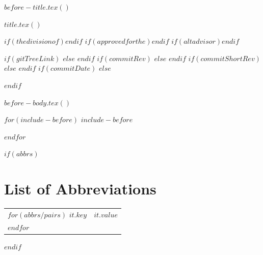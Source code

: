 $before-title.tex()$

$title.tex()$

$if(thedivisionof)$$endif$
$if(approvedforthe)$$endif$
$if(altadvisor)$$endif$

$if(gitTreeLink)$
\newcommand{\gitTree}{$gitTreeLink$}
$else$
\newcommand{\gitTree}{https://www.example.com}
$endif$
$if(commitRev)$
\newcommand{\commitRevRaw}{$commitRev$}
$else$
\newcommand{\commitRevRaw}{0000000000000000000000000000000000000000}
$endif$
\newcommand{\commitRev}{commit {\tt\commitRevRaw}}
$if(commitShortRev)$
\newcommand{\commitShortRevRaw}{$commitShortRev$}
$else$
\newcommand{\commitShortRevRaw}{000000}
$endif$
\newcommand{\commitShortRev}{commit {\tt\commitShortRevRaw}}
$if(commitDate)$
\newcommand{\commitDate}{$commitDate$}
$else$
\usepackage{datetime2}
\newcommand{\commitDate}{\DTMnow}
$endif$

\usepackage{todonotes}

\usepackage{fvextra}


\pagestyle{empty}
$before-body.tex()$

$for(include-before)$
$include-before$

$endfor$

	
$if(abbrs)$
\chapter*{List of Abbreviations}
\begin{table}[h]
    \centering %
    \begin{tabular}{p{} | p{}}
        $for(abbrs/pairs)$
        \textbf{$it.key$} & $it.value$ \\
        $endfor$
    \end{tabular}
\end{table}
$endif$

